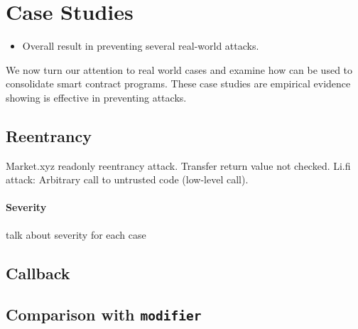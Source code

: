 \section{Case Studies} \label{sec:case}
\begin{itemize}
	\item Overall result in preventing several real-world attacks.
\end{itemize}

We now turn our attention to real world cases and examine how \lang
can be used to consolidate smart contract programs.
These case studies are empirical evidence showing \lang is effective
in preventing attacks.

\subsection{Reentrancy}
Market.xyz readonly reentrancy attack.
Transfer return value not checked.
Li.fi attack: Arbitrary call to untrusted code (low-level call).

\paragraph{Severity} talk about severity for each case

\subsection{Callback}

\subsection{Comparison with \texttt{modifier}}



